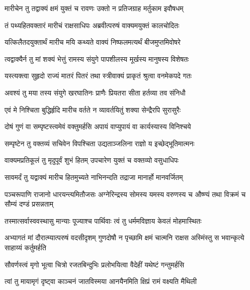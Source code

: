 
\twolineshloka
{मारीचेन तु तद्वाक्यं क्षमं युक्तं च रावणः}
{उक्तो न प्रतिजग्राह मर्तुकाम इवौषधम्} %

\twolineshloka
{तं पथ्यहितवक्तारं मारीचं राक्षसाधिपः}
{अब्रवीत्परुषं वाक्यमयुक्तं कालचोदितः} %

\twolineshloka
{यत्किलैतदयुक्तार्थं मारीच मयि कथ्यते}
{वाक्यं निष्फलमत्यर्थं बीजमुप्तमिवोषरे} %

\twolineshloka
{त्वद्वाक्यैर्न तु मां शक्यं भेत्तुं रामस्य संयुगे}
{पापशीलस्य मूर्खस्य मानुषस्य विशेषतः} %

\twolineshloka
{यस्त्यक्त्वा सुहृदो राज्यं मातरं पितरं तथा}
{स्त्रीवाक्यं प्राकृतं श्रुत्वा वनमेकपदे गतः} %

\twolineshloka
{अवश्यं तु मया तस्य संयुगे खरघातिनः}
{प्राणैः प्रियतरा सीता हर्तव्या तव संनिधौ} %

\twolineshloka
{एवं मे निश्चिता बुद्धिर्हृदि मारीच वर्तते}
{न व्यावर्तयितुं शक्या सेन्द्रैरपि सुरासुरैः} %

\twolineshloka
{दोषं गुणं वा सम्पृष्टस्त्वमेवं वक्तुमर्हसि}
{अपायं वाप्युपायं वा कार्यस्यास्य विनिश्चये} %

\twolineshloka
{सम्पृष्टेन तु वक्तव्यं सचिवेन विपश्चिता}
{उद्यताञ्जलिना राज्ञो य इच्छेद्भूतिमात्मनः} %

\twolineshloka
{वाक्यमप्रतिकूलं तु मृदुपूर्वं शुभं हितम्}
{उपचारेण युक्तं च वक्तव्यो वसुधाधिपः} %

\twolineshloka
{सावमर्दं तु यद्वाक्यं मारीच हितमुच्यते}
{नाभिनन्दति तद्राजा मानार्हो मानवर्जितम्} %

\threelineshloka
{पञ्चरूपाणि राजानो धारयन्त्यमितौजसः}
{अग्नेरिन्द्रस्य सोमस्य यमस्य वरुणस्य च}
{औष्ण्यं तथा विक्रमं च सौम्यं दण्डं प्रसन्नताम्} %

\twolineshloka
{तस्मात्सर्वास्ववस्थासु मान्याः पूज्याश्च पार्थिवाः}
{त्वं तु धर्ममविज्ञाय केवलं मोहमास्थितः} %

\threelineshloka
{अभ्यागतं मां दौरात्म्यात्परुषं वदसीदृशम्}
{गुणदोषौ न पृच्छामि क्षमं चात्मनि राक्षस}
{अस्मिंस्तु स भवान्कृत्ये साहाय्यं कर्तुमर्हति} %

\twolineshloka
{सौवर्णस्त्वं मृगो भूत्वा चित्रो रजतबिन्दुभिः}
{प्रलोभयित्वा वैदेहीं यथेष्टं गन्तुमर्हसि} %

\twolineshloka
{त्वां तु मायामृगं दृष्ट्वा काञ्चनं जातविस्मया}
{आनयैनमिति क्षिप्रं रामं वक्ष्यति मैथिली} %

